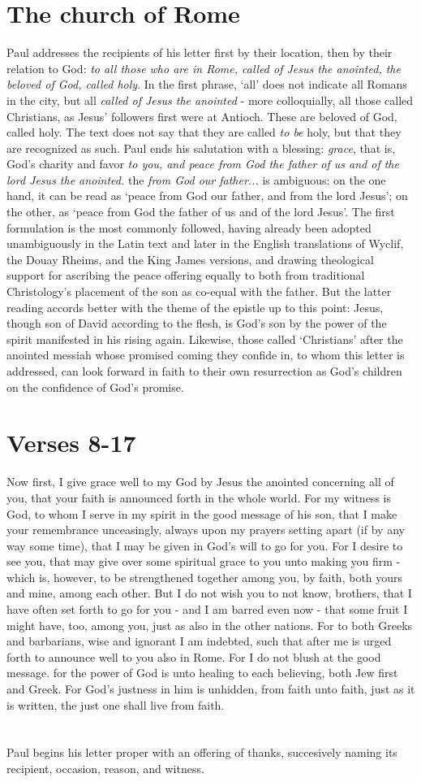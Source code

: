 \section{The church of Rome}
Paul addresses the recipients of his letter first by their location, then by their relation to God: \emph{to all those who are in Rome, called of Jesus the anointed, the beloved of God, called holy}. In the first phrase, `all' does not indicate all Romans in the city, but all \emph{called of Jesus the anointed} - more colloquially, all those called Christians, as Jesus' followers first were at Antioch. These are beloved of God, called holy. The text does not say that they are called \emph{to be} holy, but that they are recognized as such. Paul ends his salutation with a blessing: \emph{grace}, that is, God's charity and favor \emph{to you, and peace from God the father of us and of the lord Jesus the anointed.} the \emph{from God our father...} is ambiguous: on the one hand, it can be read as `peace from God our father, and from the lord Jesus'; on the other, as `peace from God the father of us and of the lord Jesus'. The first formulation is the most commonly followed, having already been adopted unambiguously in the Latin text and later in the English translations of Wyclif, the Douay Rheims, and the King James versions, and drawing theological support for ascribing the peace offering equally to both from traditional Christology's placement of the son as co-equal with the father. But the latter reading accords better with the theme of the epistle up to this point: Jesus, though son of David according to the flesh, is God's son by the power of the spirit manifested in his rising again. Likewise, those called `Christians' after the anointed messiah whose promised coming they confide in, to whom this letter is addressed, can look forward in faith to their own resurrection as God's children on the confidence of God's promise.

\section{Verses 8-17}
Now first, I give grace well to my God by Jesus the anointed concerning all of you, that your faith is announced forth in the whole world. For my witness is God, to whom I serve in my spirit in the good message of his son, that I make your remembrance unceasingly, always upon my prayers setting apart (if by any way some time), that I may be given in God's will to go for you. For I desire to see you, that may give over some spiritual grace to you unto making you firm - which is, however, to be strengthened together among you, by faith, both yours and mine, among each other. But I do not wish you to not know, brothers, that I have often set forth to go for you -  and I am barred even now - that some fruit I might have, too, among you, just as also in the other nations. For  to both Greeks and barbarians, wise and ignorant I am indebted, such that after me is urged forth to announce well to you also in Rome. For I do not blush at the good message. for the power of God is unto healing to each believing, both Jew first and Greek. For God's justness in him is unhidden, from faith unto faith, just as it is written, the just one shall live from faith. 

\section{}
Paul begins his letter proper with an offering of thanks, succesively naming its recipient, occasion, reason, and witness.